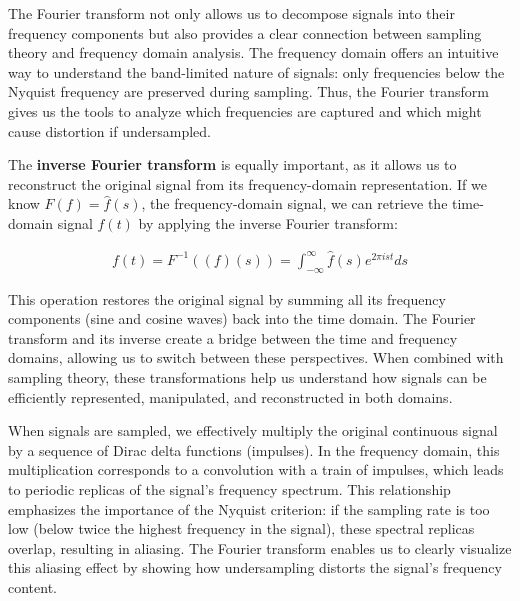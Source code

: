 The Fourier transform not only allows us to decompose signals into their frequency components but also provides a clear connection between sampling theory and frequency domain analysis. The frequency domain offers an intuitive way to understand the band-limited nature of signals: only frequencies below the Nyquist frequency are preserved during sampling. Thus, the Fourier transform gives us the tools to analyze which frequencies are captured and which might cause distortion if undersampled.

The \textbf{inverse Fourier transform} is equally important, as it allows us to reconstruct the original signal from its frequency-domain representation. If we know \( F(f) = \hat{f}(s) \), the frequency-domain signal, we can retrieve the time-domain signal \( f(t) \) by applying the inverse Fourier transform:

\begin{align}
  f(t) = F^{-1}((f)(s)) = \int_{-\infty}^{\infty} \hat{f}(s) e^{2\pi i s t} ds  
\end{align}


This operation restores the original signal by summing all its frequency components (sine and cosine waves) back into the time domain. The Fourier transform and its inverse create a bridge between the time and frequency domains, allowing us to switch between these perspectives. When combined with sampling theory, these transformations help us understand how signals can be efficiently represented, manipulated, and reconstructed in both domains.


When signals are sampled, we effectively multiply the original continuous signal by a sequence of Dirac delta functions (impulses). In the frequency domain, this multiplication corresponds to a convolution with a train of impulses, which leads to periodic replicas of the signal's frequency spectrum. This relationship emphasizes the importance of the Nyquist criterion: if the sampling rate is too low (below twice the highest frequency in the signal), these spectral replicas overlap, resulting in aliasing. The Fourier transform enables us to clearly visualize this aliasing effect by showing how undersampling distorts the signal's frequency content.


